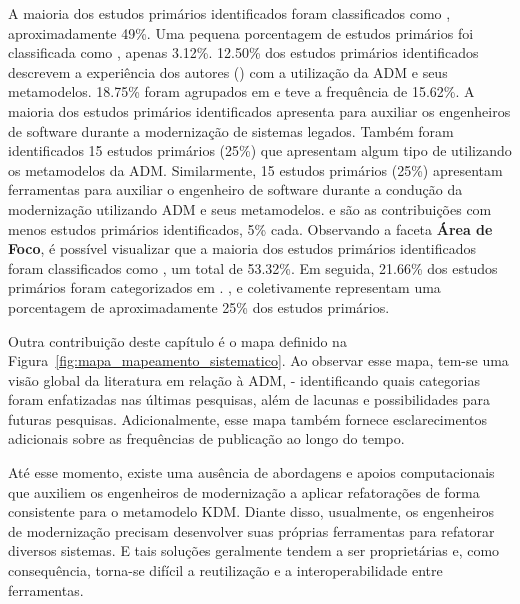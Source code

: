 A maioria dos estudos primários identificados foram classificados como , aproximadamente 49\%. Uma pequena porcentagem de estudos primários foi classificada como , apenas 3.12\%. 12.50\% dos estudos primários identificados descrevem a experiência dos autores () com a utilização da ADM e seus metamodelos. 18.75\% foram agrupados em  e  teve a frequência de 15.62\%. A maioria dos estudos primários identificados apresenta  para auxiliar os engenheiros de software durante a modernização de sistemas legados. Também foram identificados 15 estudos primários (25\%) que apresentam algum tipo de  utilizando os metamodelos da ADM. Similarmente, 15 estudos primários (25\%) apresentam ferramentas para auxiliar o engenheiro de software durante a condução da modernização utilizando ADM e seus metamodelos.  e  são as contribuições com menos estudos primários identificados, 5\% cada. Observando a faceta \textbf{Área de Foco}, é possível visualizar que a maioria dos estudos primários identificados foram classificados como , um total de 53.32\%. Em seguida, 21.66\% dos estudos primários foram categorizados em . ,  e  coletivamente representam uma porcentagem de aproximadamente 25\% dos estudos primários.


Outra contribuição deste capítulo é o mapa definido na Figura~\ref{fig:mapa_mapeamento_sistematico}. Ao observar esse mapa, tem-se uma visão global da literatura em relação à ADM, - identificando quais categorias foram enfatizadas nas últimas pesquisas, além de lacunas e possibilidades para futuras pesquisas. Adicionalmente, esse mapa também fornece esclarecimentos adicionais sobre as frequências de publicação ao longo do tempo.



Até esse momento, existe uma ausência de abordagens e apoios computacionais que auxiliem os engenheiros de modernização a aplicar refatorações de forma consistente para o metamodelo KDM. Diante disso, usualmente, os engenheiros de modernização precisam desenvolver suas próprias ferramentas para refatorar diversos sistemas. E tais soluções geralmente tendem a ser proprietárias e, como consequência, torna-se difícil a reutilização e a interoperabilidade entre ferramentas. 

